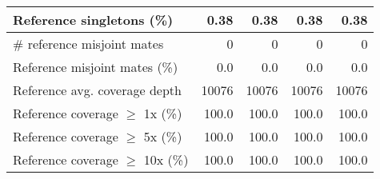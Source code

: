 \documentclass[12pt,a4paper]{article}
\begin{document}
\begin{table}[ht]
\begin{center}
\begin{tabular}{|l*{4}{|r}|}
Reference singletons (\%) & 0.38 & 0.38 & 0.38 & 0.38 \\ \hline
\# reference misjoint mates & 0 & 0 & 0 & 0 \\ \hline
Reference misjoint mates (\%) & 0.0 & 0.0 & 0.0 & 0.0 \\ \hline
Reference avg. coverage depth & 10076 & 10076 & 10076 & 10076 \\ \hline
Reference coverage $\geq$ 1x (\%) & 100.0 & 100.0 & 100.0 & 100.0 \\ \hline
Reference coverage $\geq$ 5x (\%) & 100.0 & 100.0 & 100.0 & 100.0 \\ \hline
Reference coverage $\geq$ 10x (\%) & 100.0 & 100.0 & 100.0 & 100.0 \\ \hline
\end{tabular}
\end{center}
\end{table}
\end{document}
